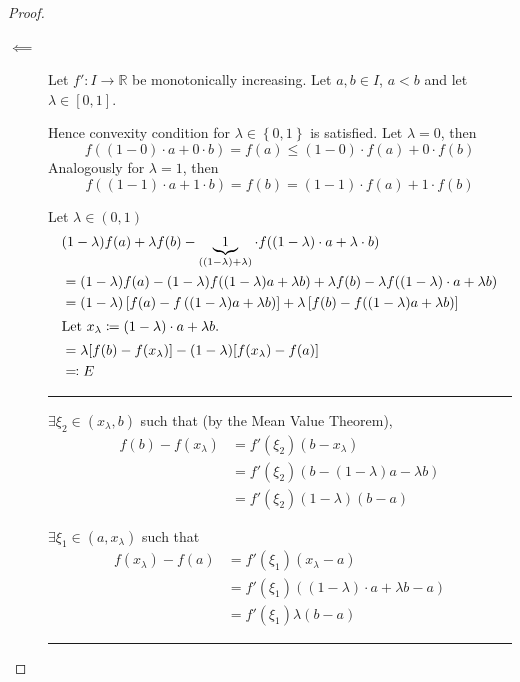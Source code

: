 \documentclass[a4paper,landscape,twocolumn]{article}
\theoremstyle{definition}
\newcommand\set[1]{\left\{#1\right\}}
\begin{document}
\begin{proof}
  \begin{description}
    \item[$\impliedby$]
      Let $f': I \to \mathbb R$ be monotonically increasing. Let $a,b \in I$,
      $a < b$ and let $\lambda \in [0, 1]$.

      Hence convexity condition for $\lambda \in \set{0,1}$ is satisfied. Let $\lambda = 0$, then
      \[ f((1 - 0) \cdot a + 0 \cdot b) = f(a) \leq (1 - 0) \cdot f(a) + 0 \cdot f(b) \]
      Analogously for $\lambda = 1$, then
      \[ f((1 - 1) \cdot a + 1 \cdot b) = f(b) = (1 - 1) \cdot f(a) + 1 \cdot f(b) \]

      Let $\lambda \in (0,1)$
      \begin{align*}
        &(1 - \lambda) f(a) + \lambda f(b) - \underbrace{1}_{((1 - \lambda) + \lambda)}
        \cdot f((1 - \lambda) \cdot a + \lambda \cdot b) \\
        &= (1 - \lambda) f(a) - (1 - \lambda) f((1 - \lambda) a + \lambda b)
        + \lambda f(b) - \lambda f((1 - \lambda) \cdot a + \lambda b) \\
        &= (1 - \lambda) \left[f(a) - f\left((1 - \lambda) a + \lambda b\right)\right]
        + \lambda \left[f(b) - f((1 - \lambda) a + \lambda b)\right] \\
      \intertext{Let $x_\lambda \coloneqq (1 - \lambda) \cdot a + \lambda b$.}
        &= \lambda [f(b) - f(x_\lambda)] - (1 - \lambda) [f(x_\lambda) - f(a)] \\
        &\eqqcolon E
      \end{align*}

      \hrule{}
      $\exists \xi_2 \in (x_\lambda, b)$ such that (by the Mean Value Theorem),
      \begin{align*}
        f(b) - f(x_\lambda)
          &= f'(\xi_2) (b - x_\lambda) \\
          &= f'(\xi_2) (b - (1 - \lambda) a - \lambda b) \\
          &= f'(\xi_2) (1 - \lambda) (b - a)
      \end{align*}

      $\exists \xi_1 \in (a, x_\lambda)$ such that
      \begin{align*}
        f(x_\lambda) - f(a)
          &= f'(\xi_1) (x_\lambda - a) \\
          &= f'(\xi_1) ((1 - \lambda) \cdot a + \lambda b - a) \\
          &= f'(\xi_1) \lambda (b - a)
      \end{align*}
      \hrule{}


\end{description}
\end{proof}
\end{document}
